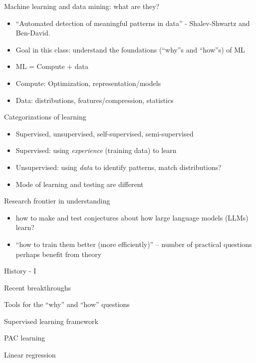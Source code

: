 \documentclass[final]{beamer}
\begin{document}
\begin{frame}{Machine learning and data mining: what are they?}
\begin{itemize}
	\item ``Automated detection of meaningful patterns in data'' - Shalev-Shwartz and Ben-David.
	\pause
	\item  Goal in this class: understand the foundations (``why''s and ``how''s) of ML
	\pause
	\item ML = Compute + data
	\pause
	\item Compute: Optimization, representation/models
	\pause
	\item Data: distributions, features/compression, statistics
\end{itemize}
\end{frame}
\begin{frame}{Categorizations of learning}
	\begin{itemize}
		\item Supervised, unsupervised, self-supervised, semi-supervised 
		\pause
	\item Supervised: using \emph{experience} (training data) to learn  
	\pause
	\item Unsupervised: using \emph{data} to identify patterns, match distributions?
	\pause
	\item Mode of learning and testing are different 
	\end{itemize}
\end{frame}
\begin{frame}{Research frontier in understanding}
	\begin{itemize}
		\item how to make and test conjectures about how large language models (LLMs) learn?
		\pause
		\item ``how to train them better (more efficiently)'' -- number of practical questions perhaps benefit from theory

	\end{itemize}
\end{frame}
\begin{frame}{History - I}
\end{frame}
\begin{frame}{Recent breakthroughs}

\end{frame}
\begin{frame}{Tools for the ``why'' and ``how'' questions}

\end{frame}
\begin{frame}{Supervised learning framework}
\end{frame}
\begin{frame}{PAC learning}
\end{frame}
\begin{frame}{Linear regression}


\end{frame}
\end{document}
